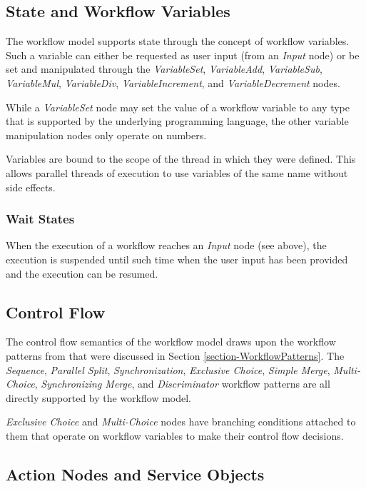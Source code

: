\subsection{State and Workflow Variables}

The workflow model supports state through the concept of workflow variables.
Such a variable can either be requested as user input (from an \emph{Input}
node) or be set and manipulated through the \emph{VariableSet},
\emph{VariableAdd}, \emph{VariableSub}, \emph{VariableMul}, \emph{VariableDiv},
\emph{VariableIncrement}, and \emph{VariableDecrement} nodes.

While a \emph{VariableSet} node may set the value of a workflow variable to
any type that is supported by the underlying programming language, the other
variable manipulation nodes only operate on numbers.

Variables are bound to the scope of the thread in which they were defined.
This allows parallel threads of execution to use variables of the same name
without side effects.

\subsubsection{Wait States}

When the execution of a workflow reaches an \emph{Input} node (see above),
the execution is suspended until such time when the user input has been
provided and the execution can be resumed.

\subsection{Control Flow}

The control flow semantics of the workflow model draws upon the workflow
patterns from \cite{BK03} that were discussed in Section
\ref{section-WorkflowPatterns}. The \emph{Sequence}, \emph{Parallel Split},
\emph{Synchronization}, \emph{Exclusive Choice}, \emph{Simple Merge},
\emph{Multi-Choice}, \emph{Synchronizing Merge}, and \emph{Discriminator}
workflow patterns are all directly supported by the workflow model.

\emph{Exclusive Choice} and \emph{Multi-Choice} nodes have branching
conditions attached to them that operate on workflow variables to make their
control flow decisions.

\subsection{Action Nodes and Service Objects}

